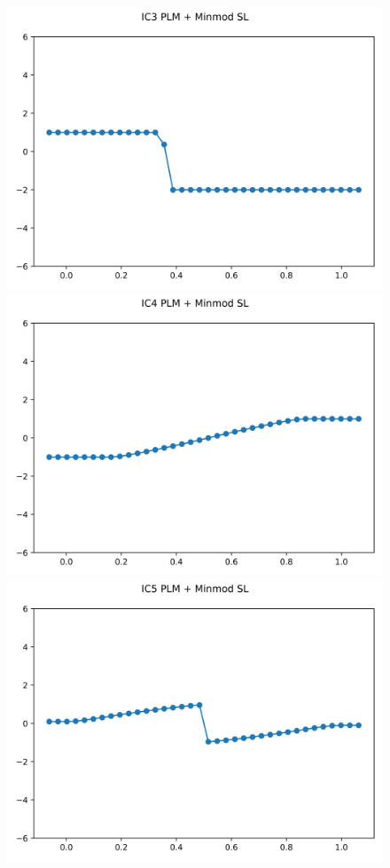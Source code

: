 \documentclass{article}
\begin{document}
\begin{figure}[t]
        \includegraphics[width=.95\textwidth]{../../code/IC3Methodpm_plot.png}
        \includegraphics[width=.95\textwidth]{../../code/IC4Methodpm_plot.png}
        \includegraphics[width=.95\textwidth]{../../code/IC5Methodpm_plot.png}

\end{figure}
\end{document}
